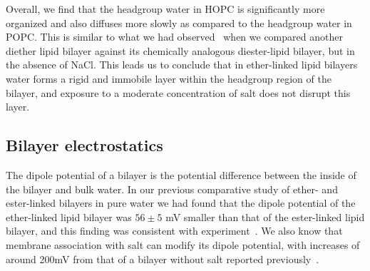 \documentclass[12pt,openany,final]{book}
\begin{document}
Overall, we find that the headgroup water in HOPC is significantly more organized and also diffuses more slowly as compared 
to the headgroup water in POPC. This is similar to what we had 
observed~\cite{kruczek:2017:ether} when we compared another diether lipid 
bilayer against its chemically analogous diester-lipid bilayer, but in the absence of NaCl. 
This leads us to conclude that in ether-linked lipid bilayers water forms a rigid and immobile layer within the headgroup region of the bilayer,
and exposure to a moderate concentration of salt does not disrupt this layer.%

\subsection{Bilayer electrostatics}

The dipole potential of a bilayer is the potential difference between the inside of the bilayer 
and bulk water. In our previous comparative study of ether- and ester-linked bilayers in pure water\cite{kruczek:2017:ether} 
we had found that the dipole potential of the ether-linked lipid bilayer was $56 \pm 5$ mV smaller 
than that of the ester-linked lipid bilayer, and this finding was consistent with experiment~\cite{gawrisch:1992}. 
We also know that membrane association with salt can modify its dipole potential, with increases
of around 200mV from that of a bilayer without salt reported previously~\cite{kruczek:2017,Berkowitz:2006,Cordomi:2008}.
\end{document}
